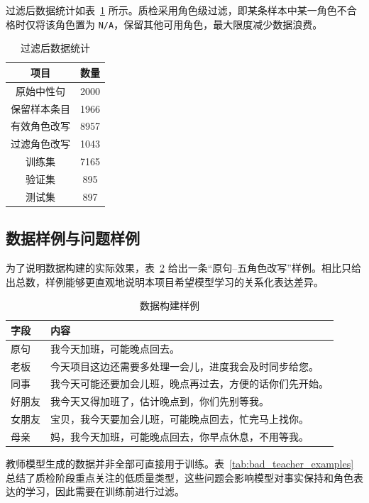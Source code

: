 \documentclass[12pt,a4paper]{ctexart}
\begin{document}
过滤后数据统计如表~\ref{tab:data_stats} 所示。质检采用角色级过滤，即某条样本中某一角色不合格时仅将该角色置为 \texttt{N/A}，保留其他可用角色，最大限度减少数据浪费。

\begin{table}[H]
\centering
\caption{过滤后数据统计}
\label{tab:data_stats}
\begin{tabular}{c|c}
\toprule
项目 & 数量 \\
\midrule
原始中性句 & 2000 \\
保留样本条目 & 1966 \\
有效角色改写 & 8957 \\
过滤角色改写 & 1043 \\
训练集 & 7165 \\
验证集 & 895 \\
测试集 & 897 \\
\bottomrule
\end{tabular}
\end{table}

\subsection{数据样例与问题样例}

为了说明数据构建的实际效果，表~\ref{tab:data_example} 给出一条“原句--五角色改写”样例。相比只给出总数，样例能够更直观地说明本项目希望模型学习的关系化表达差异。

\begin{table}[H]
\centering
\caption{数据构建样例}
\label{tab:data_example}
\begin{tabular}{p{2.4cm}|p{9.8cm}}
\toprule
字段 & 内容 \\
\midrule
原句 & 我今天加班，可能晚点回去。 \\
老板 & 今天项目这边还需要多处理一会儿，进度我会及时同步给您。 \\
同事 & 我今天可能还要加会儿班，晚点再过去，方便的话你们先开始。 \\
好朋友 & 我今天又得加班了，估计晚点到，你们先别等我。 \\
女朋友 & 宝贝，我今天要加会儿班，可能晚点回去，忙完马上找你。 \\
母亲 & 妈，我今天加班，可能晚点回去，你早点休息，不用等我。 \\
\bottomrule
\end{tabular}
\end{table}

教师模型生成的数据并非全部可直接用于训练。表~\ref{tab:bad_teacher_examples} 总结了质检阶段重点关注的低质量类型，这些问题会影响模型对事实保持和角色表达的学习，因此需要在训练前进行过滤。
\end{document}
